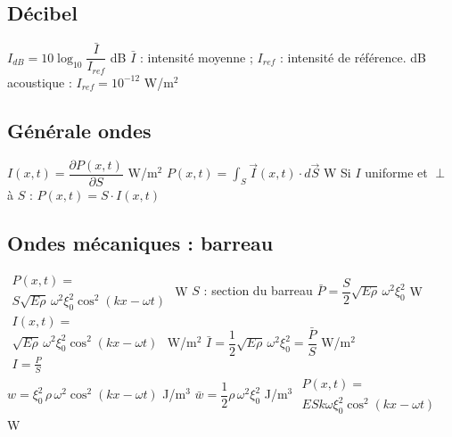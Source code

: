 \subsection{Décibel}
\begin{formules}
    {$I_{dB} = 10\log_{10}\dfrac{\bar I}{I_{ref}}$}
    {dB}
    {$\bar I$ : intensité moyenne ; $I_{ref}$ : intensité de référence. dB acoustique : \newline
     $I_{ref} = 10^{-12}$ W/m$^2$}
\end{formules}

\subsection{Générale ondes}
\begin{formules}
    {$I(x,t) = \dfrac{\partial P(x,t)}{\partial S}$}
    {W/m$^2$}
    {}
    {$P(x,t) = \displaystyle\int_S \vec I(x,t)\cdot d\vec S$}
    {W}
    {Si $I$ uniforme et $\perp$ à $S$ : \newline $P(x,t) = S\cdot I(x,t)$}
\end{formules}

\subsection{Ondes mécaniques : barreau}
\begin{formules}
    {$\begin{gathered}
      P(x,t) = \\
      S\sqrt{E\rho}\,\omega^2\xi_0^2\cos^2(kx - \omega t)
     \end{gathered}$}
    {W}
    {$S$ : section du barreau}
    {$\bar P = \dfrac{S}{2}\sqrt{E\rho}\,\omega^2\xi_0^2$}
    {W}
    {}
    {$\begin{gathered}
      I(x,t) = \\
      \sqrt{E\rho}\,\omega^2\xi_0^2\cos^2(kx - \omega t) \\
      I = \frac{P}{S}
     \end{gathered}$}
    {W/m$^2$}
    {}
    {$\bar I = \dfrac{1}{2}\sqrt{E\rho}\,\omega^2\xi_0^2 = \dfrac{\bar P}{S}$}
    {W/m$^2$}
    {}
    {$w = \xi_0^2\,\rho\,\omega^2\cos^2(kx - \omega t)$}
    {J/m$^3$}
    {}
    {$\bar w = \dfrac{1}{2}\rho\,\omega^2\xi_0^2$}
    {J/m$^3$}
    {}
    {$\begin{gathered}
      P(x,t) = \\
      ESk\omega\xi_0^2\cos^2(kx - \omega t)
     \end{gathered}$}
    {W}
    {}
\end{formules}

